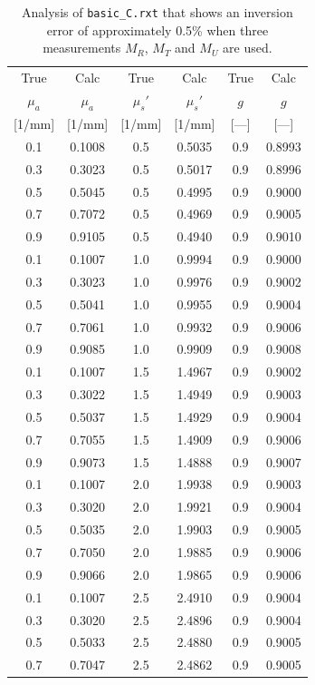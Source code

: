 \documentclass{article}
\begin{document}
\begin{table}
\begin{center}
\begin{tabular}{cc|cc|cc}
True & Calc & True & Calc& True & Calc\\
$\mu_a$ & $\mu_a$ & $\mu_s'$ & $\mu_s'$ & $g$ &$g$\\
\hbox{}[1/mm] & [1/mm] & [1/mm] & [1/mm]& [---]& [---]  \\
\hline
0.1 & 0.1008 & 0.5 & 0.5035 & 0.9 & 0.8993\\
0.3 & 0.3023 & 0.5 & 0.5017 & 0.9 & 0.8996\\
0.5 & 0.5045 & 0.5 & 0.4995 & 0.9 & 0.9000\\
0.7 & 0.7072 & 0.5 & 0.4969 & 0.9 & 0.9005\\
0.9 & 0.9105 & 0.5 & 0.4940 & 0.9 & 0.9010\\[2mm]
0.1 & 0.1007 & 1.0 & 0.9994 & 0.9 & 0.9000\\
0.3 & 0.3023 & 1.0 & 0.9976 & 0.9 & 0.9002\\
0.5 & 0.5041 & 1.0 & 0.9955 & 0.9 & 0.9004\\
0.7 & 0.7061 & 1.0 & 0.9932 & 0.9 & 0.9006\\
0.9 & 0.9085 & 1.0 & 0.9909 & 0.9 & 0.9008\\[2mm]
0.1 & 0.1007 & 1.5 & 1.4967 & 0.9 & 0.9002\\
0.3 & 0.3022 & 1.5 & 1.4949 & 0.9 & 0.9003\\
0.5 & 0.5037 & 1.5 & 1.4929 & 0.9 & 0.9004\\
0.7 & 0.7055 & 1.5 & 1.4909 & 0.9 & 0.9006\\
0.9 & 0.9073 & 1.5 & 1.4888 & 0.9 & 0.9007\\[2mm]
0.1 & 0.1007 & 2.0 & 1.9938 & 0.9 & 0.9003\\
0.3 & 0.3020 & 2.0 & 1.9921 & 0.9 & 0.9004\\
0.5 & 0.5035 & 2.0 & 1.9903 & 0.9 & 0.9005\\
0.7 & 0.7050 & 2.0 & 1.9885 & 0.9 & 0.9006\\
0.9 & 0.9066 & 2.0 & 1.9865 & 0.9 & 0.9006\\[2mm]
0.1 & 0.1007 & 2.5 & 2.4910 & 0.9 & 0.9004\\
0.3 & 0.3020 & 2.5 & 2.4896 & 0.9 & 0.9004\\
0.5 & 0.5033 & 2.5 & 2.4880 & 0.9 & 0.9005\\
0.7 & 0.7047 & 2.5 & 2.4862 & 0.9 & 0.9005\\
\end{tabular}
\caption{Analysis of \texttt{basic\_C.rxt} that shows an inversion error
of approximately 0.5\% when three measurements $M_R$, $M_T$ and $M_U$ are
used.}
\end{center}
\end{table}
\end{document}
